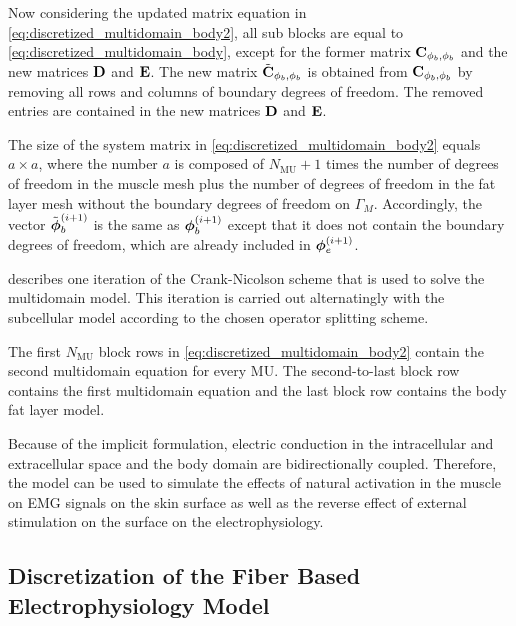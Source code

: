 Now considering the updated matrix equation in \cref{eq:discretized_multidomain_body2}, all sub blocks are equal to \cref{eq:discretized_multidomain_body}, except for the former matrix $\textbf{C}_{\phi_b,\phi_b}$ and the new matrices $\textbf{D}$ and $\textbf{E}$. The new matrix $\tilde{\textbf{C}}_{\phi_b,\phi_b}$ is obtained from $\textbf{C}_{\phi_b,\phi_b}$ by removing all rows and columns of boundary degrees of freedom. The removed entries are contained in the new matrices $\textbf{D}$ and $\textbf{E}$.

The size of the system matrix in \cref{eq:discretized_multidomain_body2} equals $a\times a$, where the number $a$ is composed of $N_\text{MU}+1$ times the number of degrees of freedom in the muscle mesh plus the number of degrees of freedom in the fat layer mesh without the boundary degrees of freedom on $\Gamma_M$. Accordingly, the vector $\tilde{\boldsymbol{\phi}}_b^{(i+1)}$ is the same as $\boldsymbol{\phi}_b^{(i+1)}$ except that it does not contain the boundary degrees of freedom, which are already included in $\boldsymbol{\phi}_e^{(i+1)}$.

 describes one iteration of the Crank-Nicolson scheme that is used to solve the multidomain model. This iteration is carried out alternatingly with the subcellular model according to the chosen operator splitting scheme. 

The first $N_\text{MU}$ block rows in \cref{eq:discretized_multidomain_body2} contain the second multidomain equation for every MU. The second-to-last block row contains the first multidomain equation and the last block row  contains the body fat layer model.

Because of the implicit formulation, electric conduction in the intracellular and extracellular space and the body domain are bidirectionally coupled. Therefore, the model can be used to simulate the effects of natural activation in the muscle on EMG signals on the skin surface as well as the reverse effect of external stimulation on the surface on the electrophysiology.

\subsection{Discretization of the Fiber Based Electrophysiology Model}


